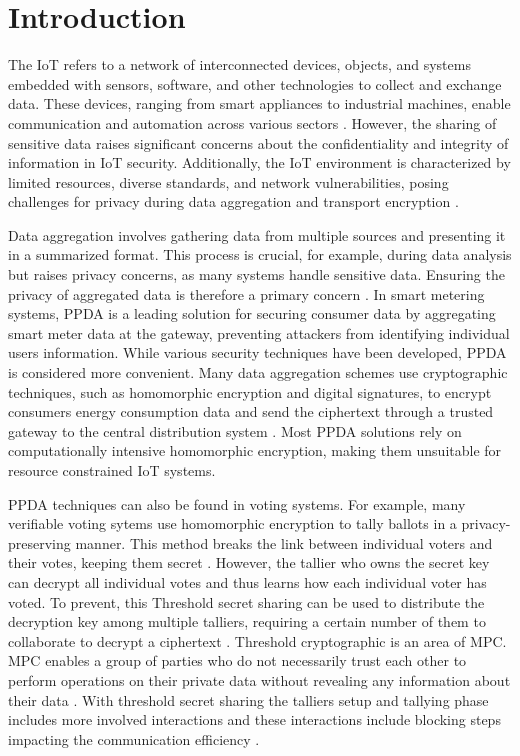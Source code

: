 \chapter{Introduction}
The \ac{IoT} refers to a network of interconnected devices, objects, and systems embedded with sensors, software, and other technologies to collect and exchange data. These devices, ranging from smart appliances to industrial machines, enable communication and automation across various sectors \cite[1]{combinatorial}. However, the sharing of sensitive data raises significant concerns about the confidentiality and integrity of information in \ac{IoT} security. Additionally, the \ac{IoT} environment is characterized by limited resources, diverse standards, and network vulnerabilities, posing challenges for privacy during data aggregation and transport encryption \cite[1]{smpc}.

Data aggregation involves gathering data from multiple sources and presenting it in a summarized format. This process is crucial, for example, during data analysis but raises privacy concerns, as many systems handle sensitive data. Ensuring the privacy of aggregated data is therefore a primary concern \cite[2]{ppda-fog}. In smart metering systems, \ac{PPDA} is a leading solution for securing consumer data by aggregating smart meter data at the gateway, preventing attackers from identifying individual users information. While various security techniques have been developed, \ac{PPDA} is considered more convenient. Many data aggregation schemes use cryptographic techniques, such as homomorphic encryption and digital signatures, to encrypt consumers energy consumption data and send the ciphertext through a trusted gateway to the central distribution system \cite[113-114]{smart-meter}. Most \ac{PPDA} solutions rely on computationally intensive homomorphic encryption, making them unsuitable for resource constrained \ac{IoT} systems.

\ac{PPDA} techniques can also be found in voting systems. For example, many verifiable voting sytems use homomorphic encryption to tally ballots in a privacy-preserving manner. This method breaks the link between individual voters and their votes, keeping them secret \cite[53]{stuve-study}. However, the tallier who owns the secret key can decrypt all individual votes and thus learns how each individual voter has voted. To prevent, this Threshold secret sharing can be used to distribute the decryption key among multiple talliers, requiring a certain number of them to collaborate to decrypt a ciphertext \cite[40]{stuve-study}. Threshold cryptographic is an area of \ac{MPC}. \ac{MPC} enables a group of parties who do not necessarily trust each other to perform operations on their private data without revealing any information about their data \cite[2]{mpc-ing}. With threshold secret sharing the talliers setup and tallying phase includes more involved interactions and these interactions include blocking steps impacting the communication efficiency \cite[45]{stuve-study}.

